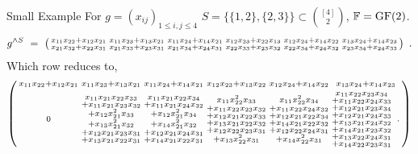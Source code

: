 \documentclass[9pt]{beamer}
\begin{document}
\begin{frame}[fragile]{Small Example}
  For $g = (x_{ij})_{1\leq i, j\leq 4}$  $S = \{ \{1, 2\}, \{2, 3\} \} \subset \binom{[4]}{2}$, ${\mathbb F} = \operatorname{GF}(2)$.
  \[
    g^{\wedge S} \ = \ \begin{psmallmatrix} x_{11}x_{22} + x_{12}x_{21} & x_{11}x_{23} + x_{13}x_{21} & x_{11}x_{24} + x_{14}x_{21} &  x_{12}x_{23} + x_{22}x_{13} &  x_{12}x_{24}+ x_{14}x_{22} &  x_{13}x_{24} + x_{14}x_{23} \\  x_{21}x_{32} + x_{22}x_{31} & x_{21}x_{33} + x_{23}x_{31} & x_{21}x_{34} + x_{24}x_{31} & x_{22}x_{33} + x_{23}x_{32} & x_{22}x_{34} + x_{24}x_{32} & x_{23}x_{34} + x_{24}x_{33}\end{psmallmatrix} \enspace.
  \]
  Which row reduces to, 
  \[
    \begin{psmallmatrix} x_{11}x_{22} + x_{12}x_{21} & x_{11}x_{23} + x_{13}x_{21} & x_{11}x_{24} + x_{14}x_{21} &  x_{12}x_{23} + x_{13}x_{22} &  x_{12}x_{24}+ x_{14}x_{22} &  x_{13}x_{24} + x_{14}x_{23} \\[3pt]
      0 & \substack{x_{11}x_{21}x_{22}x_{33} \\ + x_{11}x_{21}x_{23}x_{32} \\ + x_{12}x_{21}^2x_{33} \\+ x_{13}x_{21}^2x_{32} \\ + x_{12}x_{21}x_{23}x_{31} \\ + x_{13}x_{21}x_{22}x_{31}} & \substack{x_{11}x_{21}x_{22}x_{34} \\+ x_{11}x_{21}x_{24}x_{32} \\ + x_{12}x_{21}^2x_{34} \\+ x_{14}x_{21}^2x_{32} \\ + x_{12}x_{21}x_{24}x_{31} \\+ x_{14}x_{21}x_{22}x_{31}} & \substack{x_{11}x_{22}^2x_{33} \\+ x_{11}x_{22}x_{23}x_{32} \\+ x_{12}x_{21}x_{22}x_{33} \\+ x_{13}x_{21}x_{22}x_{32} \\+ x_{12}x_{22}x_{23}x_{31} \\+ x_{13}x_{22}^2x_{31}} & \substack{x_{11}x_{22}^2x_{34} \\+ x_{11}x_{22}x_{24}x_{32} \\+ x_{12}x_{21}x_{22}x_{34} \\+ x_{14}x_{21}x_{22}x_{32} \\+ x_{12}x_{22}x_{24}x_{31} \\+ x_{14}x_{22}^2x_{31}} & \substack{x_{11}x_{22}x_{23}x_{34} \\+ x_{11}x_{22}x_{24}x_{33} \\+ x_{12}x_{21}x_{23}x_{34} \\+ x_{12}x_{21}x_{24}x_{33} \\+ x_{13}x_{21}x_{24}x_{32} \\+ x_{14}x_{21}x_{23}x_{32} \\+ x_{13}x_{22}x_{24}x_{31} \\+ x_{14}x_{22}x_{23}x_{31}} \enspace .
    \end{psmallmatrix} 
  \]


\end{frame}
\end{document}
